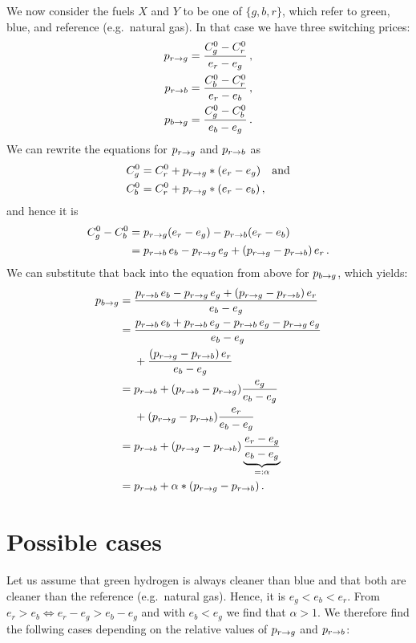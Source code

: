 \documentclass[%
 draft,
 aapm,
 mph,%
 amsmath,amssymb,
 reprint,%
]{revtex4-2}
\begin{document}
We now consider the fuels $X$ and $Y$ to be one of $\{g, b, r\}$, which refer to green, blue, and reference (e.g.~natural gas). In that case we have three switching prices:
\begin{align}
    p_{r\rightarrow g}    &=     \frac{C^0_g - C^0_r}{e_r - e_g} \,,\\
    p_{r\rightarrow b}    &=     \frac{C^0_b - C^0_r}{e_r - e_b} \,,\\
    p_{b\rightarrow g}   &=     \frac{C^0_g - C^0_b}{e_b - e_g} \,.
\end{align}
We can rewrite the equations for $p_{r\rightarrow g}$ and $p_{r\rightarrow b}$ as
\begin{align}
    C^0_g &= C^0_r + p_{r\rightarrow g} * (e_r - e_g) \quad\text{and} \\
    C^0_b &= C^0_r + p_{r\rightarrow g} * (e_r - e_b) \,,
\end{align}
and hence it is
\begin{align}
    C^0_g - C^0_b &= p_{r\rightarrow g} (e_r - e_g) - p_{r\rightarrow b} (e_r - e_b) \\
                  &= p_{r\rightarrow b} \, e_b - p_{r\rightarrow g} \, e_g + (p_{r\rightarrow g} - p_{r\rightarrow b}) \, e_r \,.
\end{align}
We can substitute that back into the equation from above for $p_{b\rightarrow g}$, which yields:
\begin{align}
    p_{b\rightarrow g} &= \frac{p_{r\rightarrow b} \, e_b - p_{r\rightarrow g} \, e_g + (p_{r\rightarrow g} - p_{r\rightarrow b}) \, e_r}{e_b - e_g} \\
    &= \frac{p_{r\rightarrow b} \, e_b + p_{r\rightarrow b} \, e_g - p_{r\rightarrow b} \, e_g - p_{r\rightarrow g} \, e_g}{e_b - e_g}\\ &~~~~+ \frac{(p_{r\rightarrow g} - p_{r\rightarrow b}) \, e_r}{e_b - e_g} \\
    &= p_{r\rightarrow b} + (p_{r\rightarrow b} - p_{r\rightarrow g}) \frac{e_g}{e_b-e_g} \\ &~~~~+ (p_{r\rightarrow g} - p_{r\rightarrow b}) \frac{e_r}{e_b-e_g} \\
    &= p_{r\rightarrow b} + (p_{r\rightarrow g} - p_{r\rightarrow b}) \underbrace{\frac{e_r - e_g}{e_b - e_g}}_{=: \alpha} \\
    &= p_{r\rightarrow b} + \alpha * (p_{r\rightarrow g} - p_{r\rightarrow b}) \,.
\end{align}

\section{Possible cases}
Let us assume that green hydrogen is always cleaner than blue and that both are cleaner than the reference (e.g.~natural gas). Hence, it is $e_g < e_b < e_r$. From $e_r > e_b \Leftrightarrow e_r - e_g > e_b - e_g$ and with $e_b < e_g$ we find that $\alpha > 1$. We therefore find the follwing cases depending on the relative values of $p_{r\rightarrow g}$ and $p_{r\rightarrow b}$:
\end{document}
